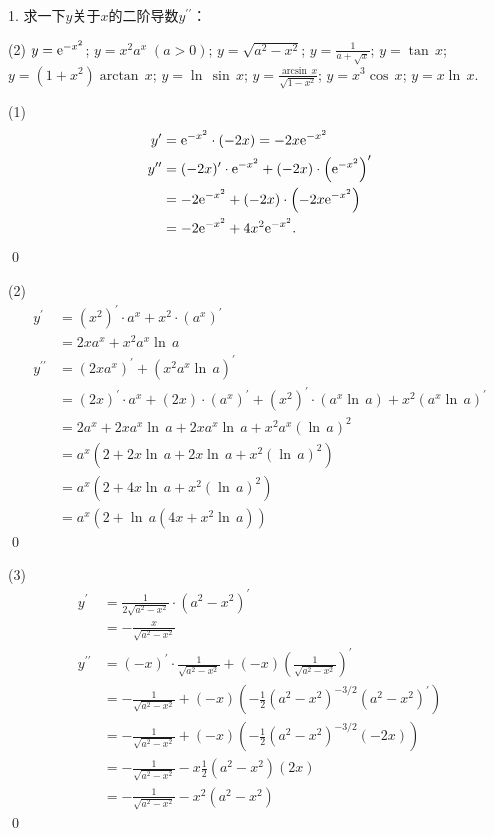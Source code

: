 \exercise

1. 求一下$y$关于$x$的二阶导数$y^{\prime\prime}$：
\begin{tasks}(2)
    \task $y=\mathrm{e}^{-x^2}$;
    \task $y=x^2 a^x \; (a > 0)$;
    \task $y=\sqrt{a^2-x^2}$;
    \task $y=\displaystyle\frac{1}{a+\sqrt{x}}$;
    \task $y=\tan \, x$;
    \task $y = (1+x^2)\arctan \, x$;
    \task $y = \ln \, \sin \, x$;
    \task $y=\displaystyle\frac{\arcsin \, x}{\sqrt{1-x^2}}$;
    \task $y=x^3\cos\, x$;
    \task $y=x\ln \, x$.
\end{tasks}

(1) \solve
\begin{align}
    y^\prime &= \mathrm{e}^{-x^2} \cdot (-2x) = -2x\mathrm{e}^{-x^2} \\
    y^{\prime\prime} &= (-2x)^\prime \cdot \mathrm{e}^{-x^2} + (-2x) \cdot \left(\mathrm{e}^{-x^2}\right)^{\prime} \\
    &= -2\mathrm{e}^{-x^2} + (-2x) \cdot \left(-2x\mathrm{e}^{-x^2}\right) \\
    &= -2\mathrm{e}^{-x^2} +4x^2\mathrm{e}^{-x^2}.
\end{align}
\qed\bigskip

(2) \solve
\begin{align}
    y^\prime &= \left(x^2\right)^\prime \cdot a^x + x^2 \cdot \left(a^x\right)^\prime \\
    &= 2x a^x + x^2 a^x \ln \, a \\
    y^{\prime\prime} &= \left(2xa^x\right)^\prime + \left(x^2 a^x \ln \, a\right)^{\prime} \\
    &= \left(2x\right)^\prime \cdot a^x + \left(2x\right) \cdot \left(a^x\right)^\prime + \left(x^2\right)^\prime \cdot \left(a^x \ln \, a\right) + x^2 \left(a^x \ln \, a\right)^\prime \\
    &= 2a^x + 2x a^x \ln \, a + 2x a^x \ln \, a + x^2 a^x (\ln \, a)^2 \\
    &= a^x (2+2x \ln \, a + 2x \ln \, a + x^2 \left(\ln \, a\right)^2) \\
    &= a^x \left(2 + 4x \ln \, a + x^2 \left(\ln \, a\right)^2\right) \\
    &= a^x \left(2 + \ln \, a\left(4x + x^2 \ln \, a\right)\right)
\end{align}
\qed\bigskip

(3) \solve
\begin{align}
    y^{\prime} &= \frac{1}{2\sqrt{a^2-x^2}} \cdot \left(a^2-x^2\right)^{\prime} \\
    &= - \frac{x}{\sqrt{a^2-x^2}} \\
    y^{\prime\prime} &= (-x)^\prime \cdot \frac{1}{\sqrt{a^2-x^2}} + (-x) \left(\frac{1}{\sqrt{a^2-x^2}}\right)^{\prime} \\
    &= -\frac{1}{\sqrt{a^2-x^2}} + (-x)\left(-\frac{1}{2}\left(a^2-x^2\right)^{-3/2}\left(a^2-x^2\right)^\prime\right) \\
    &= -\frac{1}{\sqrt{a^2-x^2}} + (-x)\left(-\frac{1}{2}\left(a^2-x^2\right)^{-3/2}\left(-2x\right)\right) \\
    &= -\frac{1}{\sqrt{a^2-x^2}} - x \frac{1}{2} \left(a^2-x^2\right)\left(2x\right) \\
    &= -\frac{1}{\sqrt{a^2-x^2}} - x^2\left(a^2-x^2\right)
\end{align}
\qed\bigskip

